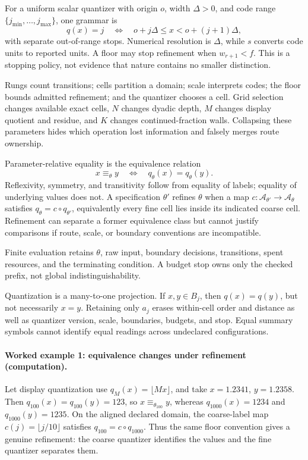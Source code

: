 For a uniform scalar quantizer with origin \(o\), width \(\Delta>0\), and code range
\(\{j_{\min},\ldots,j_{\max}\}\), one grammar is
\[
 q(x)=j\quad\Longleftrightarrow\quad o+j\Delta\leq x<o+(j+1)\Delta,
\]
with separate out-of-range stops.  Numerical resolution is \(\Delta\), while \(s\) converts code units to reported
units.  A floor may stop refinement when \(w_{r+1}<f\).  This is a stopping policy, not evidence that nature contains
no smaller distinction.

Rungs count transitions; cells partition a domain; scale interprets codes; the floor bounds admitted refinement; and
the quantizer chooses a cell.  Grid selection changes available exact cells, \(N\) changes dyadic depth, \(M\) changes
display quotient and residue, and \(K\) changes continued-fraction walls.  Collapsing these parameters hides which
operation lost information and falsely merges route ownership.

Parameter-relative equality is the equivalence relation
\[
                 x\equiv_\theta y\quad\Longleftrightarrow\quad q_\theta(x)=q_\theta(y).
\]
Reflexivity, symmetry, and transitivity follow from equality of labels; equality of underlying values does not.
A specification \(\theta'\) refines \(\theta\) when a map \(c:\mathcal A_{\theta'}\to\mathcal A_\theta\) satisfies
\(q_\theta=c\circ q_{\theta'}\), equivalently every fine cell lies inside its indicated coarse cell.  Refinement can
separate a former equivalence class but cannot justify comparisons if route, scale, or boundary conventions are
incompatible.

Finite evaluation retains \(\theta\), raw input, boundary decisions, transitions, spent resources, and the terminating
condition.  A budget stop owns only the checked prefix, not global indistinguishability.

Quantization is a many-to-one projection.  If \(x,y\in B_j\), then \(q(x)=q(y)\), but not necessarily \(x=y\).
Retaining only \(a_j\) erases within-cell order and distance as well as quantizer version, scale, boundaries, budgets,
and stop.  Equal summary symbols cannot identify equal readings across undeclared configurations.

\paragraph{Worked example 1: equivalence changes under refinement (computation).}
Let display quantization use \(q_M(x)=\lfloor Mx\rfloor\), and take \(x=1.2341\), \(y=1.2358\).  Then
\(q_{100}(x)=q_{100}(y)=123\), so \(x\equiv_{\theta_{100}}y\), whereas
\(q_{1000}(x)=1234\) and \(q_{1000}(y)=1235\).  On the aligned declared domain, the coarse-label map
\(c(j)=\lfloor j/10\rfloor\) satisfies \(q_{100}=c\circ q_{1000}\).  Thus the same floor convention gives a genuine
refinement: the coarse quantizer identifies the values and the fine quantizer separates them.

